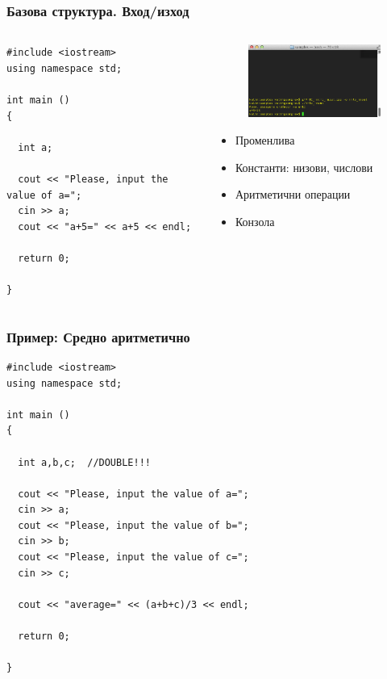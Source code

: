 \documentclass{beamer}
\begin{document}
\begin{frame}[fragile]
\frametitle{Базова структура. Вход/изход}

\begin{columns}[t]
  \begin{column}{0.2\textwidth}
\begin{lstlisting}
#include <iostream>
using namespace std;

int main ()
{

  int a;

  cout << "Please, input the value of a=";
  cin >> a;
  cout << "a+5=" << a+5 << endl;

  return 0;

}
\end{lstlisting}

  \end{column}
  \begin{column}{0.8\textwidth}
\begin{figure}
\flushright
\includegraphics[width=6cm]{images/sample_inout}
\end{figure}
\begin{itemize}
\item Променлива
\item Константи: низови, числови
\item Аритметични операции
\item Конзола
\end{itemize}

  \end{column}
\end{columns}


\end{frame}

\begin{frame}[fragile]
\frametitle{Пример: Средно аритметично}

\begin{lstlisting}
#include <iostream>
using namespace std;

int main ()
{

  int a,b,c;  //DOUBLE!!!

  cout << "Please, input the value of a=";
  cin >> a;
  cout << "Please, input the value of b=";
  cin >> b;
  cout << "Please, input the value of c=";
  cin >> c;

  cout << "average=" << (a+b+c)/3 << endl;

  return 0;

}
\end{lstlisting}

\end{frame}
\end{document}

